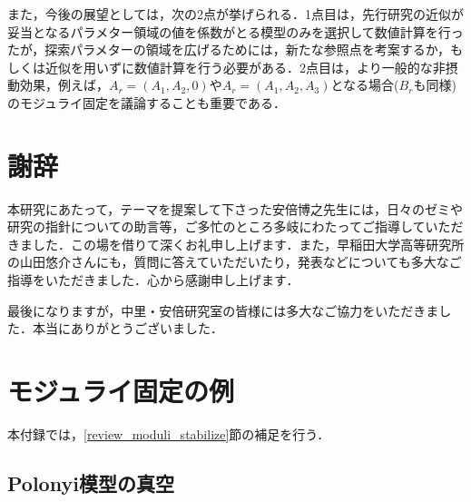 \documentclass[a4paper,uplatex,dvipdfmx,10pt]{jsarticle}
\theoremstyle{definition}
\renewcommand{\theequation}{\thesection.\arabic{equation}}
\renewcommand{\thefigure}{\thesection.\arabic{figure}}
\renewcommand{\thetable}{\thesection.\arabic{table}}
\begin{document}
また，今後の展望としては，次の2点が挙げられる．1点目は，先行研究の近似が妥当となるパラメター領域の値を係数がとる模型のみを選択して数値計算を行ったが，探索パラメターの領域を広げるためには，新たな参照点を考案するか，もしくは近似を用いずに数値計算を行う必要がある．2点目は，より一般的な非摂動効果，例えば，$A_{r}=(A_{1},A_{2},0)$や$A_{r}=(A_{1},A_{2},A_{3})$となる場合($B_{r}$も同様)のモジュライ固定を議論することも重要である．


\section*{謝辞}

本研究にあたって，テーマを提案して下さった安倍博之先生には，日々のゼミや研究の指針についての助言等，ご多忙のところ多岐にわたってご指導していただきました．この場を借りて深くお礼申し上げます．また，早稲田大学高等研究所の山田悠介さんにも，質問に答えていただいたり，発表などについても多大なご指導をいただきました．心から感謝申し上げます．

最後になりますが，中里・安倍研究室の皆様には多大なご協力をいただきました．本当にありがとうございました．


\makeatletter
\renewcommand{\appendix}{\par
  \setcounter{section}{0}%
  \setcounter{subsection}{0}%
  \gdef\presectionname{\appendixname}%
  \gdef\postsectionname{}%
  \gdef\thesection{\presectionname\@Alph\c@section\postsectionname}%
  \gdef\thesubsection{\@Alph\c@section.\@arabic\c@subsection}%
  \renewcommand{\theequation}{\@Alph\c@section.\arabic{equation}}%
  \renewcommand{\thefigure}{\@Alph\c@section.\arabic{figure}}%
  \renewcommand{\thetable}{\@Alph\c@section.\arabic{table}}%
}
\makeatother
\appendix


\section{モジュライ固定の例}
\label{moduli_stabili_eg}

本付録では，\ref{review_moduli_stabilize}節の補足を行う．

\subsection{Polonyi模型の真空}
\label{polonyi_reference}
\end{document}
